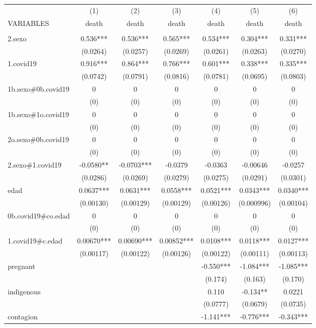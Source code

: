 \documentclass[]{article}
\begin{document}
\begin{tabular}{lcccccc} \hline
 & (1) & (2) & (3) & (4) & (5) & (6) \\
VARIABLES & death & death & death & death & death & death \\ \hline
 &  &  &  &  &  &  \\
2.sexo & 0.536*** & 0.536*** & 0.565*** & 0.534*** & 0.304*** & 0.331*** \\
 & (0.0264) & (0.0257) & (0.0269) & (0.0261) & (0.0263) & (0.0270) \\
1.covid19 & 0.916*** & 0.864*** & 0.766*** & 0.601*** & 0.338*** & 0.335*** \\
 & (0.0742) & (0.0791) & (0.0816) & (0.0781) & (0.0695) & (0.0803) \\
1b.sexo\#0b.covid19 & 0 & 0 & 0 & 0 & 0 & 0 \\
 & (0) & (0) & (0) & (0) & (0) & (0) \\
1b.sexo\#1o.covid19 & 0 & 0 & 0 & 0 & 0 & 0 \\
 & (0) & (0) & (0) & (0) & (0) & (0) \\
2o.sexo\#0b.covid19 & 0 & 0 & 0 & 0 & 0 & 0 \\
 & (0) & (0) & (0) & (0) & (0) & (0) \\
2.sexo\#1.covid19 & -0.0580** & -0.0703*** & -0.0379 & -0.0363 & -0.00646 & -0.0257 \\
 & (0.0286) & (0.0269) & (0.0279) & (0.0275) & (0.0291) & (0.0301) \\
edad & 0.0637*** & 0.0631*** & 0.0558*** & 0.0521*** & 0.0343*** & 0.0340*** \\
 & (0.00130) & (0.00129) & (0.00129) & (0.00126) & (0.000996) & (0.00104) \\
0b.covid19\#co.edad & 0 & 0 & 0 & 0 & 0 & 0 \\
 & (0) & (0) & (0) & (0) & (0) & (0) \\
1.covid19\#c.edad & 0.00670*** & 0.00690*** & 0.00852*** & 0.0108*** & 0.0118*** & 0.0127*** \\
 & (0.00117) & (0.00122) & (0.00126) & (0.00122) & (0.00111) & (0.00113) \\
pregnant &  &  &  & -0.550*** & -1.084*** & -1.085*** \\
 &  &  &  & (0.174) & (0.163) & (0.170) \\
indigenous &  &  &  & 0.110 & -0.134** & 0.0221 \\
 &  &  &  & (0.0777) & (0.0679) & (0.0735) \\
contagion &  &  &  & -1.141*** & -0.776*** & -0.343*** \\

\end{tabular}
\end{document}
